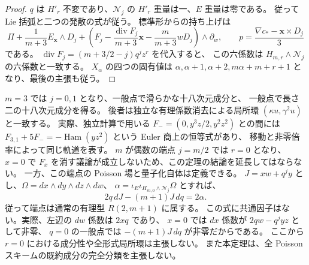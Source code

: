 \begin{proof}
$q$ は $H'_r$ 不変であり、$\mathcal N_j$ の $H'_r$ 重量は一、$E$ 重量は零である。
従って Lie 括弧と二つの発散の式が従う。
標準形からの持ち上げは
\[
 \Pi+\frac1{m+3}E_{\mathbf x}\wedge D_j+
 \left(F_j-\frac{\operatorname{div}F_j}{m+3}\mathbf x
                   -\frac m{m+3}wD_j\right)\wedge\partial_w,
 \qquad p=\frac{\nabla c_*-\mathbf x\times D_j}{3}
\]
である。
$\operatorname{div}F_j=(m+3/2-j)q^jz^r$ を代入すると、
この六係数は $H_{m,r}\wedge\mathcal N_j$ の六係数と一致する。
$X_\alpha$ の四つの固有値は
$\alpha,\alpha+1,\alpha+2,m\alpha+m+r+1$ となり、最後の主張も従う。
\end{proof}

\begin{remark}[重み三および除外した端点]
$m=3$ では $j=0,1$ となり、一般点で滑らかな十八次元成分と、
一般点で長さ二の十八次元成分を得る。
後者は独立な有理係数消去による局所環 $(\kappa u,\gamma^2u)$ と一致する。
実際、独立計算で用いる $F_-=(0,y^3z/2,y^2z^2)$ との間には
$F_{3,1}+5F_-=-\operatorname{Ham}(yz^2)$ という Euler 商上の恒等式があり、
移動と非零倍率によって同じ軌道を表す。
$m$ が偶数の端点 $j=m/2$ では $r=0$ となり、
$x=0$ で $F_x$ を消す議論が成立しないため、この定理の結論を延長してはならない。
一方、この端点の Poisson 場と量子化自体は定義できる。
$J=xw+q^j y$ とし、$\Omega=dx\wedge dy\wedge dz\wedge dw$、
$\alpha=\iota_E\iota_{H_{m,0}\wedge\mathcal N_j}\Omega$ とすれば、
\[
 2q\,dJ-(m+1)J\,dq=2\alpha.
\]
従って端点は通常の有理型 $R(2,m+1)$ に属する。
この式に共通因子はない。実際、左辺の $dw$ 係数は $2xq$ であり、
$x=0$ では $dx$ 係数が $2qw-q^jyz$ として非零、
$q=0$ の一般点では $-(m+1)J\,dq$ が非零だからである。
ここから $r=0$ における成分性や全形式局所環は主張しない。
また本定理は、全 Poisson スキームの既約成分の完全分類を主張しない。
\end{remark}
